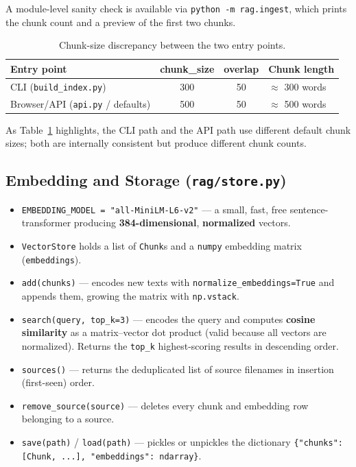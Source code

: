 \documentclass[11pt,a4paper]{article}
\newcommand{\code}[1]{\texttt{#1}}
\begin{document}
A module-level sanity check is available via \code{python -m rag.ingest},
which prints the chunk count and a preview of the first two chunks.

\begin{table}[h]
\centering
\small
\begin{tabular}{lccl}
\toprule
\textbf{Entry point} & \textbf{chunk\_size} & \textbf{overlap} & \textbf{Chunk length} \\
\midrule
CLI (\code{build\_index.py})            & 300 & 50 & $\approx$ 300 words \\
Browser/API (\code{api.py} / defaults)  & 500 & 50 & $\approx$ 500 words \\
\bottomrule
\end{tabular}
\caption{Chunk-size discrepancy between the two entry points.}
\label{tab:chunk}
\end{table}

As Table~\ref{tab:chunk} highlights, the CLI path and the API path use
different default chunk sizes; both are internally consistent but produce
different chunk counts.

\subsection{Embedding and Storage (\code{rag/store.py})}
\begin{itemize}
  \item \code{EMBEDDING\_MODEL = "all-MiniLM-L6-v2"} --- a small, fast,
        free sentence-transformer producing \textbf{384-dimensional},
        \textbf{normalized} vectors.
  \item \code{VectorStore} holds a list of \code{Chunk}s and a
        \texttt{numpy} embedding matrix (\code{embeddings}).
  \item \code{add(chunks)} --- encodes new texts with
        \code{normalize\_embeddings=True} and appends them, growing the
        matrix with \code{np.vstack}.
  \item \code{search(query, top\_k=3)} --- encodes the query and computes
        \textbf{cosine similarity} as a matrix--vector dot product (valid
        because all vectors are normalized). Returns the \code{top\_k}
        highest-scoring results in descending order.
  \item \code{sources()} --- returns the deduplicated list of source
        filenames in insertion (first-seen) order.
  \item \code{remove\_source(source)} --- deletes every chunk and embedding
        row belonging to a source.
  \item \code{save(path)} / \code{load(path)} --- pickles or unpickles the
        dictionary \code{\{"chunks": [Chunk, ...], "embeddings": ndarray\}}.
\end{itemize}
\end{document}
